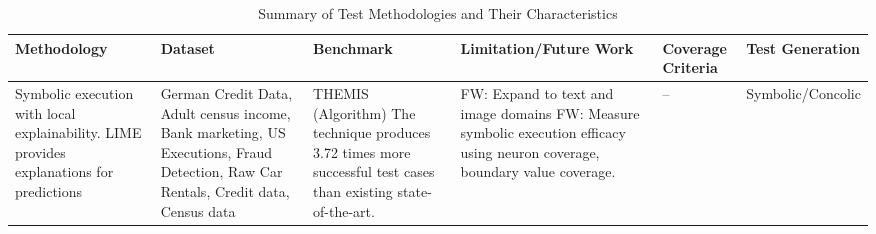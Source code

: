 \documentclass{article}
\begin{document}
\begin{landscape}
\begin{xltabular}{\linewidth}{|>{\raggedright\arraybackslash}X|>{\raggedright\arraybackslash}X|>{\raggedright\arraybackslash}p{3.5cm}|>{\raggedright\arraybackslash}p{6cm}|>{\raggedright\arraybackslash}p{2.5cm}|>{\raggedright\arraybackslash}p{3cm}|} %
\caption{Summary of Test Methodologies and Their Characteristics} \\
\hline
{} 
\textbf{Methodology} & \textbf{Dataset} & \textbf{Benchmark} & \textbf{Limitation/Future Work} & \textbf{Coverage Criteria} & \textbf{Test Generation} \\ \endhead

Symbolic execution with local explainability. LIME provides explanations for predictions\cite{Agarwal} & German Credit Data, Adult census income, Bank marketing, US Executions, Fraud Detection, Raw Car Rentals, Credit data, Census data & THEMIS (Algorithm) The technique produces 3.72 times more successful test cases than existing state-of-the-art. & FW: Expand to text and image domains FW: Measure symbolic execution efficacy using neuron coverage, boundary value coverage. & -- & Symbolic/Concolic \\ \hline



\end{xltabular}
\end{landscape}
\end{document}
